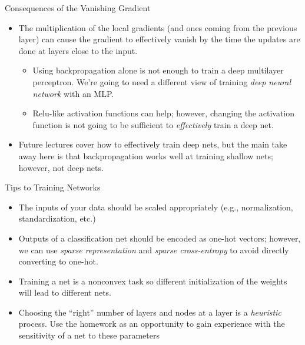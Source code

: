 \documentclass[aspectratio=169,xcolor=dvipsnames,svgnames,x11names,fleqn]{beamer}
\begin{document}
\begin{frame}{Consequences of the Vanishing Gradient}
\begin{itemize}
    \item The multiplication of the local gradients (and ones coming from the previous layer) can cause the gradient to effectively vanish by the time the updates are done at layers close to the input. 
    \begin{itemize}
        \item Using backpropagation alone is not enough to train a deep multilayer perceptron. We're going to need a different view of training {\em deep neural network} with an MLP. 
        \item Relu-like activation functions can help; however, changing the activation function is not going to be sufficient to {\em effectively} train a deep net. 
    \end{itemize}
    \item Future lectures cover how to effectively train deep nets, but the main take away here is that backpropagation works well at training shallow nets; however, not deep nets. 
\end{itemize}
\end{frame}



\begin{frame}{Tips to Training Networks}

\begin{tblock}{}
\begin{itemize}
    \item The inputs of your data should be scaled appropriately (e.g., normalization, standardization, etc.)
    \item Outputs of a classification net should be encoded as one-hot vectors; however, we can use {\em sparse representation} and {\em sparse cross-entropy} to avoid directly converting to one-hot.
    \item Training a net is a nonconvex task so different initialization of the weights will lead to different nets. 
    \item Choosing the ``right'' number of layers and nodes at a layer is a {\em heuristic} process. Use the homework as an opportunity to gain experience with the sensitivity of a net to these parameters 
\end{itemize}
\end{tblock}

\end{frame}
\end{document}

